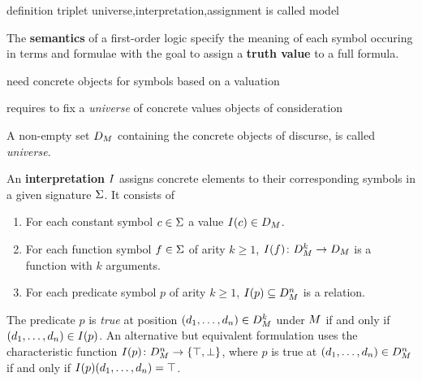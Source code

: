             definition triplet universe,interpretation,assignment is called model

            The \textbf{semantics} of a first-order logic specify the meaning of each symbol occuring in terms and formulae with the goal to assign a \textbf{truth value} to a full formula.

            need concrete objects for symbols
            based on a valuation

            requires to fix a \textit{universe} of concrete values
            objects of consideration

            \begin{definition}[Universe]
                A non-empty set $D_{M}$ containing the concrete objects of discurse, is called \textit{universe}.
            \end{definition}

            \begin{definition}[Interpretation]
                An \textbf{interpretation} $\interpret$ assigns concrete elements to their corresponding symbols in a given signature $\Sigma$. It consists of
                \begin{enumerate}
                    \item For each constant symbol $c\in\Sigma$ a value $\interpret[c]\in\universe$.
                    \item For each function symbol $f\in\Sigma$ of arity $k\geq 1$, $\interpret[f]\from\universe^k\to\universe$ is a function with $k$ arguments.
                    \item For each predicate symbol $p$ of arity $k\geq 1$, $\interpret[p]\subseteq\universe^n$ is a relation.
                \end{enumerate}

            \end{definition}


            The predicate $p$ is \textit{true} at position $(d_1,\ldots,d_n)\in D_{M}^k$ under $M$ if and only if $(\range{d_1}{d_n})\in\interpret[p]$.
            An alternative but equivalent formulation uses the characteristic function $\interpret[p]\from\universe^n\to\{\ltrue,\lfalse\}$, where $p$ is true at $(d_1,\ldots,d_n)\in D_{M}^n$ if and only if $\interpret[p](\range{d_1}{d_n})=\ltrue$.

